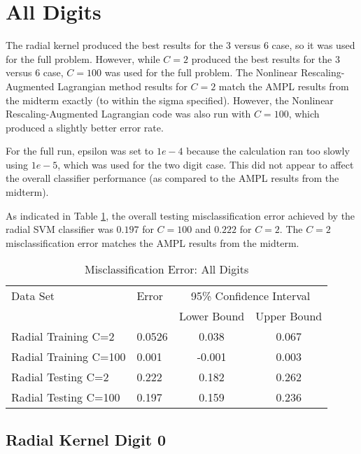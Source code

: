 \documentclass{article}
\begin{document}
\section{All Digits}\label{digit-all}
\normalsize

The radial kernel produced the best results for the 3 versus 6 case, so it was used for the full problem. However, while \(C=2\) produced the best results for the 3 versus 6 case, \(C=100\) was used for the full problem. The Nonlinear Rescaling-Augmented Lagrangian method results for \(C=2\) match the AMPL results from the midterm exactly (to within the sigma specified). However, the Nonlinear Rescaling-Augmented Lagrangian code was also run with \(C=100\), which produced a slightly better error rate.

For the full run, epsilon was set to \(1e-4\) because the calculation ran too slowly using \(1e-5\), which was used for the two digit case. This did not appear to affect the overall classifier performance (as compared to the AMPL results from the midterm).

As indicated in Table \ref{table2}, the overall testing misclassification error achieved by the radial SVM classifier was \(0.197\) for \(C=100\) and \(0.222\) for \(C=2\). The \(C=2\) misclassification error matches the AMPL results from the midterm.

\begin{table}
\caption{Misclassification Error: All Digits}
\begin{center}
\begin{tabular}{llcc}
\toprule
Data Set & Error & \multicolumn{2}{c}{95\% Confidence Interval} \\
\cmidrule(r){3-4}
& & Lower Bound & Upper Bound \\
\midrule
Radial Training C=2 & 0.0526 & 0.038 & 0.067 \\
Radial Training C=100 & 0.001 & -0.001 & 0.003 \\
Radial Testing C=2 & 0.222 & 0.182 & 0.262 \\
Radial Testing C=100 & 0.197 & 0.159 & 0.236 \\
\bottomrule
\end{tabular}
\end{center}
\label{table2}
\end{table}

\subsection{Radial Kernel Digit 0}\label{radial0}
\end{document}
